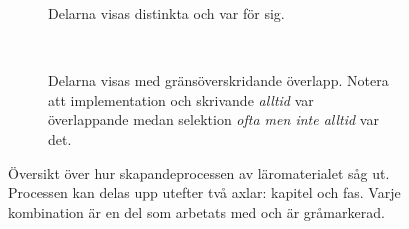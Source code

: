 \begin{binge}
\begin{figure}[tph]
    \centering
    \begin{subfigure}[t]{0.5\textwidth}
        \centering
        \caption{Delarna visas distinkta och var för sig.}
        \label{fig:oversiktA}
    \end{subfigure}%
    ~ 
    \begin{subfigure}[t]{0.5\textwidth}
        \centering
        \caption{Delarna visas med gränsöverskridande överlapp. Notera att
        implementation och skrivande \textit{alltid} var överlappande medan
      selektion \textit{ofta men inte alltid} var det.} \label{fig:oversiktB}
    \end{subfigure}
    \caption{Översikt över hur skapandeprocessen av läromaterialet såg ut.
  Processen kan delas upp utefter två axlar: kapitel och fas. Varje kombination
  är en del som arbetats med och är gråmarkerad.} \end{figure}


\end{binge}
